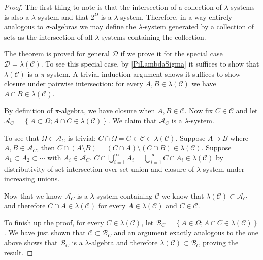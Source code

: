 \documentclass{amsart}
\theoremstyle{remark}
\theoremstyle{definition}
\begin{document}
\begin{proof}The first thing to note is that the intersection of a
  collection of $\lambda$-systems is also a $\lambda$-system and that
   $2^\Omega$ is a $\lambda$-system.
  Therefore, in a way entirely analogous to $\sigma$-algebras we may
  define the $\lambda$-system generated by a collection of sets as the
  intersection of all $\lambda$-systems containing the collection.

The theorem is proved for general $\mathcal{D}$ if we prove it for the
special case $\mathcal{D} = \lambda(\mathcal{C})$.  To see this
special case, by \ref{PiLambdaSigma} it suffices to show that
$\lambda(\mathcal{C})$ is a $\pi$-system.  A trivial induction
argument shows it suffices to show closure under pairwise
intersection:  for every $A,B \in \lambda(\mathcal{C})$ we have $A
\cap B \in \lambda(\mathcal{C})$.

By definition of $\pi$-algebra, we have closure when $A,B
\in \mathcal{C}$.  Now fix $C \in \mathcal{C}$ and let $\mathcal{A}_C
= \left \{A \subset \Omega ; A \cap C \in \lambda(\mathcal{C}) \right
\}$.  We claim that $\mathcal{A}_C$ is a $\lambda$-system.

To see that $\Omega \in \mathcal{A}_C$ is trivial: $C \cap \Omega
= C \in \mathcal{C} \subset \lambda(\mathcal{C})$.
Suppose $A \supset B$ where $A,B \in \mathcal{A}_C$, then $C
\cap (A \setminus B) = (C \cap A) \setminus (C \cap B) \in
\lambda(\mathcal{C})$.  Suppose $A_1 \subset A_2 \subset \cdots$ with
$A_i \in \mathcal{A}_C$.  $C \cap \bigcup_{i=1}^\infty A_i =
\bigcup_{i=1}^\infty C \cap A_i \in \lambda(\mathcal{C})$ by
distributivity of set intersection over set union and closure of $\lambda$-system under increasing unions.

Now that we know $\mathcal{A}_C$ is a $\lambda$-system containing
$\mathcal{C}$ we know that $\lambda(\mathcal{C}) \subset
\mathcal{A}_C$ and therefore $C \cap A \in \lambda(\mathcal{C})$ for
every $A \in \lambda(\mathcal{C})$ and $C \in \mathcal{C}$.

To finish up the proof, for every $C \in \lambda(\mathcal{C})$, let
$\mathcal{B}_C = \left \{ A \in \Omega ; A \cap C \in
  \lambda(\mathcal{C}) \right \}$.  We have just shown that
$\mathcal{C} \subset \mathcal{B}_C$ and an argument exactly analogous
to the one above shows that $\mathcal{B}_C$ is a $\lambda$-algebra and
therefore $\lambda(\mathcal{C}) \subset \mathcal{B}_C$ proving the result.
\end{proof}
\end{document}
